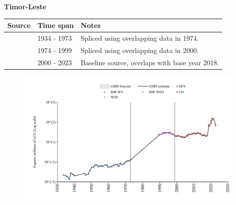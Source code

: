 \documentclass[12pt,a4paper,landscape]{article}
\begin{document}
\begin{adjustbox}{max totalsize={\paperwidth}{\paperheight},center}
\begin{minipage}[t][\textheight][t]{\textwidth}
\vspace*{0.5cm}
{}
\begin{center}
{\Large\bfseries Timor-Leste}
\end{center}
\vspace{0.5cm}
\begin{table}[H]
\centering
\small
\begin{tabular}{|l|l|l|}
\hline
\textbf{Source} & \textbf{Time span} & \textbf{Notes} \\
\hline
\rowcolor{white}\cite{HFS}& 1934 - 1973 &Spliced using overlapping data in 1974.\\
\rowcolor{lightgray}\cite{UN}& 1974 - 1999 &Spliced using overlapping data in 2000.\\
\rowcolor{white}\cite{WDI}& 2000 - 2023 &Baseline source, overlaps with base year 2018.\\
\hline
\end{tabular}
\end{table}
\begin{figure}[H]
\centering
\includegraphics[width=\textwidth,height=0.6\textheight,keepaspectratio]{graphs/TLS_exports.pdf}
\end{figure}
\end{minipage}
\end{adjustbox}
\end{document}
